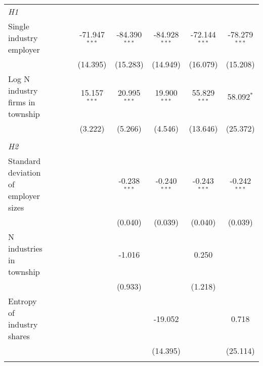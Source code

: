 \begin{tabular}{lcccccccc}
\emph{H1} \\ 
   Single industry employer                              &             &                 &                 & -71.947$^{***}$ & -84.390$^{***}$ & -84.928$^{***}$ & -72.144$^{***}$ & -78.279$^{***}$\\   
                                                         &             &                 &                 & (14.395)        & (15.283)        & (14.949)        & (16.079)        & (15.208)\\   
   Log N industry firms in township                      &             &                 &                 & 15.157$^{***}$  & 20.995$^{***}$  & 19.900$^{***}$  & 55.829$^{***}$  & 58.092$^{*}$\\   
                                                         &             &                 &                 & (3.222)         & (5.266)         & (4.546)         & (13.646)        & (25.372)\\   
\hdashline %
\\[0.1ex] %
\emph{H2} \\ 
   Standard deviation of employer sizes                  &             &                 &                 &                 & -0.238$^{***}$  & -0.240$^{***}$  & -0.243$^{***}$  & -0.242$^{***}$\\   
                                                         &             &                 &                 &                 & (0.040)         & (0.039)         & (0.040)         & (0.039)\\   
   N industries in township                              &             &                 &                 &                 & -1.016          &                 & 0.250           &   \\   
                                                         &             &                 &                 &                 & (0.933)         &                 & (1.218)         &   \\   
   Entropy of industry shares                            &             &                 &                 &                 &                 & -19.052         &                 & 0.718\\   
                                                         &             &                 &                 &                 &                 & (14.395)        &                 & (25.114)\\   
\hdashline %
\\[0.1ex] %

\end{tabular}
